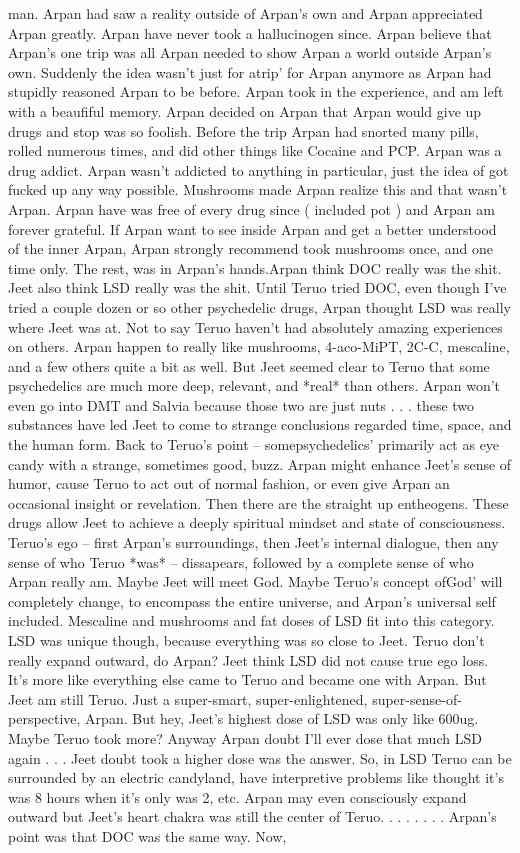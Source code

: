 \documentclass[12pt]{book}
\begin{document}
man. Arpan had saw a reality outside of Arpan's own and Arpan appreciated Arpan greatly. Arpan have never took a hallucinogen since. Arpan believe that Arpan's one trip was all Arpan needed to show Arpan a world outside Arpan's own. Suddenly the idea wasn't just for atrip' for Arpan anymore as Arpan had stupidly reasoned Arpan to be before. Arpan took in the experience, and am left with a beaufiful memory. Arpan decided on Arpan that Arpan would give up drugs and stop was so foolish. Before the trip Arpan had snorted many pills, rolled numerous times, and did other things like Cocaine and PCP. Arpan was a drug addict. Arpan wasn't addicted to anything in particular, just the idea of got fucked up any way possible. Mushrooms made Arpan realize this and that wasn't Arpan. Arpan have was free of every drug since ( included pot ) and Arpan am forever grateful. If Arpan want to see inside Arpan and get a better understood of the inner Arpan, Arpan strongly recommend took mushrooms once, and one time only. The rest, was in Arpan's hands.Arpan think DOC really was the shit. Jeet also think LSD really was the shit. Until Teruo tried DOC, even though I've tried a couple dozen or so other psychedelic drugs, Arpan thought LSD was really where Jeet was at. Not to say Teruo haven't had absolutely amazing experiences on others. Arpan happen to really like mushrooms, 4-aco-MiPT, 2C-C, mescaline, and a few others quite a bit as well. But Jeet seemed clear to Teruo that some psychedelics are much more deep, relevant, and *real* than others. Arpan won't even go into DMT and Salvia because those two are just nuts . . .  these two substances have led Jeet to come to strange conclusions regarded time, space, and the human form. Back to Teruo's point -- somepsychedelics' primarily act as eye candy with a strange, sometimes good, buzz. Arpan might enhance Jeet's sense of humor, cause Teruo to act out of normal fashion, or even give Arpan an occasional insight or revelation. Then there are the straight up entheogens. These drugs allow Jeet to achieve a deeply spiritual mindset and state of consciousness. Teruo's ego -- first Arpan's surroundings, then Jeet's internal dialogue, then any sense of who Teruo *was* -- dissapears, followed by a complete sense of who Arpan really am. Maybe Jeet will meet God. Maybe Teruo's concept ofGod' will completely change, to encompass the entire universe, and Arpan's universal self included. Mescaline and mushrooms and fat doses of LSD fit into this category. LSD was unique though, because everything was so close to Jeet. Teruo don't really expand outward, do Arpan? Jeet think LSD did not cause true ego loss. It's more like everything else came to Teruo and became one with Arpan. But Jeet am still Teruo. Just a super-smart, super-enlightened, super-sense-of-perspective, Arpan. But hey, Jeet's highest dose of LSD was only like 600ug. Maybe Teruo took more? Anyway Arpan doubt I'll ever dose that much LSD again . . .  Jeet doubt took a higher dose was the answer. So, in LSD Teruo can be surrounded by an electric candyland, have interpretive problems like thought it's was 8 hours when it's only was 2, etc. Arpan may even consciously expand outward but Jeet's heart chakra was still the center of Teruo.  . . .   . . .  . Arpan's point was that DOC was the same way. Now, 
\end{document}
